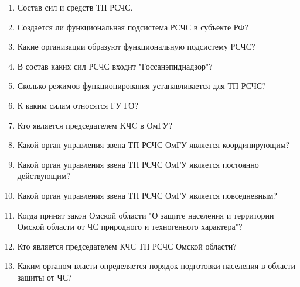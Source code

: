 \documentclass[oneside,final,14pt]{extreport}
\begin{document}
\begin{enumerate}
	\item  Состав сил и средств ТП РСЧС.
	\item  Создается ли функциональная подсистема РСЧС в субъекте РФ?
	\item Какие организации образуют функциональную подсистему РСЧС?
	\item  В состав каких сил РСЧС входит "Госсанэпиднадзор"?
	\item  Сколько режимов функционирования устанавливается для ТП РСЧС?
	\item  К каким силам относятся ГУ ГО?
	\item  Кто является председателем KЧC в ОмГУ?
	\item  Какой орган управления звена ТП РСЧС ОмГУ является координирующим?
	\item  Какой орган управления звена ТП РСЧС ОмГУ является постоянно действующим?
	\item  Какой орган управления звена ТП РСЧС ОмГУ является повседневным?
	\item  Когда принят закон Омской области "О защите населения и территории Омской области от ЧС природного и техногенного характера"?
	\item  Кто является председателем КЧС ТП РСЧС Омской области?
	\item Каким органом власти определяется порядок подготовки населения в области защиты от ЧС?
\end{enumerate}
\end{document}
